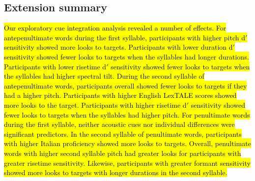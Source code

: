 \subsection{Extension summary}

\hl{Our exploratory cue integration analysis revealed a number of effects. For antepenultimate words during the first syllable, participants with higher pitch d$'$ sensitivity showed more looks to targets. Participants with lower duration d$'$ sensitivity showed fewer looks to targets when the syllables had longer durations. Participants with lower risetime d$'$ sensitivity showed fewer looks to targets when the syllables had higher spectral tilt. During the second syllable of antepenultimate words, participants overall showed fewer looks to targets if they had a higher pitch. Participants with higher English LexTALE scores showed more looks to the target. Participants with higher risetime d$'$ sensitivity showed fewer looks to targets when the syllables had higher pitch. For penultimate words during the first syllable, neither acoustic cues nor individual differences were significant predictors. In the second syllable of penultimate words, participants with higher Italian proficiency showed more looks to targets. Overall, penultimate words with higher second syllable pitch had greater looks for participants with greater risetime sensitivity. Likewise, participants with greater formant sensitivity showed more looks to targets with longer durations in the second syllable. 
}

